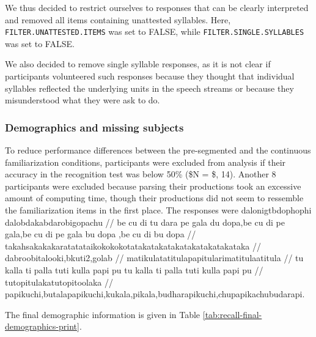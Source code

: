 \documentclass[]{article}
\begin{document}
We thus decided to restrict ourselves to responses that can be clearly
interpreted and removed all items containing unattested syllables. Here,
\texttt{FILTER.UNATTESTED.ITEMS} was set to FALSE, while
\texttt{FILTER.SINGLE.SYLLABLES} was set to FALSE.

We also decided to remove single syllable responses, as it is not clear
if participants volunteered such responses because they thought that
individual syllables reflected the underlying units in the speech
streams or because they misunderstood what they were ask to do.

\subsubsection{Demographics and missing
subjects}\label{demographics-and-missing-subjects}

To reduce performance differences between the pre-segmented and the
continuous familiarization conditions, participants were excluded from
analysis if their accuracy in the recognition test was below 50\% (\$N =
\$, 14). Another 8 participants were excluded because parsing their
productions took an excessive amount of computing time, though their
productions did not seem to ressemble the familiarization items in the
first place. The responses were dalonigtbdophophi
dalobdakabdarobigopachu // be cu di tu dara pe gala du dopa,be cu di pe
gala,be cu di pe gala bu dopa ,be cu di bu dopa //
takahsakakakaratatataikokokokotatakatakatakatakatakatakataka //
dabroobitalooki,bkuti2,golab //
matikulatatitulapapitularimatitulaatitula // tu kalla ti palla tuti
kulla papi pu tu kalla ti palla tuti kulla papi pu //
tutopitulakatutopitoolaka //
papikuchi,butalapapikuchi,kukala,pikala,budharapikuchi,chupapikachubudarapi.

The final demographic information is given in Table
\ref{tab:recall-final-demographics-print}.
\end{document}
